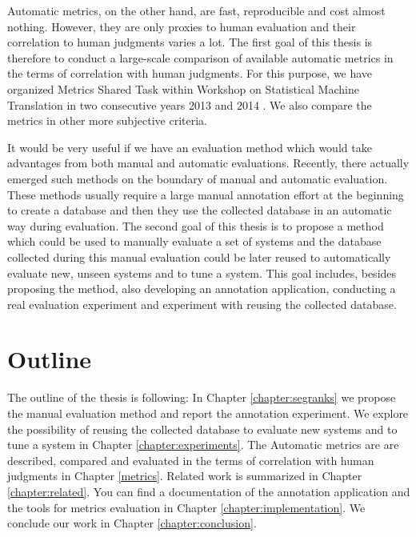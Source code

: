 Automatic metrics, on the other hand, are fast, reproducible and cost almost
nothing. However, they are only proxies to human evaluation and their
correlation to human judgments varies a lot. The first goal of this thesis is
therefore to conduct a large-scale comparison of available automatic metrics in
the terms of correlation with human judgments. For this purpose, we have
organized Metrics Shared Task within Workshop on Statistical Machine
Translation in two consecutive years 2013  and 2014
. We also compare the metrics in other more subjective
criteria. 

It would be very useful if we have an evaluation method which would take
advantages from both manual and automatic evaluations. Recently, there actually
emerged such methods on the boundary of manual and automatic evaluation. These
methods usually require a large manual annotation effort at the beginning to
create a database and then they use the collected database in an automatic way
during evaluation.  The second goal of this thesis is to propose a method which
could be used to manually evaluate a set of systems and the database collected
during this manual evaluation could be later reused to automatically evaluate
new, unseen systems and to tune a system. This goal includes, besides proposing
the method, also developing an annotation application, conducting a real
evaluation experiment and experiment with reusing the collected database. 

\section{Outline}

The outline of the thesis is following: In Chapter \ref{chapter:segranks} we
propose the manual evaluation method and report the annotation experiment. We
explore the possibility of reusing the collected database to evaluate new
systems and to tune a system in Chapter \ref{chapter:experiments}. The Automatic
metrics are are described, compared and evaluated in the terms of correlation
with human judgments in Chapter \ref{metrics}. Related work is summarized in
Chapter \ref{chapter:related}. You can find a documentation of the annotation
application and the tools for metrics evaluation in Chapter
\ref{chapter:implementation}. We conclude our work in Chapter
\ref{chapter:conclusion}.





